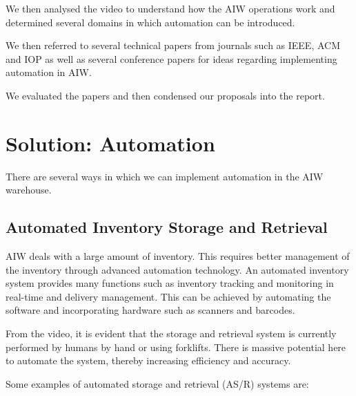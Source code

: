\documentclass{report}
\begin{document}
We then analysed the video to understand how the AIW operations work and determined several domains in which automation can be introduced. 

We then referred to several technical papers from journals such as IEEE, ACM and IOP as well as several conference papers for ideas regarding implementing automation in AIW. 

We evaluated the papers and then condensed our proposals into the report.

\section{Solution: Automation}

There are several ways in which we can implement automation in the AIW warehouse.

\subsection{Automated Inventory Storage and Retrieval}

AIW deals with a large amount of inventory. This requires better management of the inventory through advanced automation technology. An automated inventory system provides many functions such as inventory tracking and monitoring in real-time and delivery management. This can be achieved by automating the software and incorporating hardware such as scanners and barcodes.

From the video, it is evident that the storage and retrieval system is currently performed by humans by hand or using forklifts. There is massive potential here to automate the system, thereby increasing efficiency and accuracy. 

 Some examples of automated storage and retrieval (AS/R) systems are:
\end{document}
